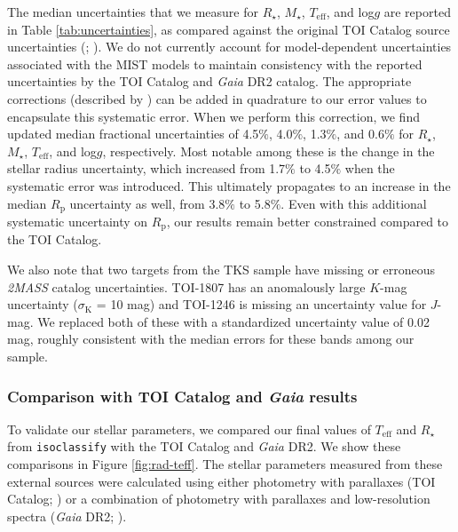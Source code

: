 \documentclass[twocolumn]{aastex63}
\begin{document}
The median uncertainties that we measure for $R_{\star}$, $M_{\star}$, $T_\textrm{eff}$, and log$g$ are reported in Table \ref{tab:uncertainties}, as compared against the original TOI Catalog source uncertainties (\citealt{Guerrero21}; \citealt{toi}). We do not currently account for model-dependent uncertainties associated with the MIST models to maintain consistency with the reported uncertainties by the TOI Catalog and \textit{Gaia} DR2 catalog. The appropriate corrections (described by \citealt{Tayar20}) can be added in quadrature to our error values to encapsulate this systematic error. When we perform this correction, we find updated median fractional uncertainties of 4.5$\%$, 4.0$\%$, 1.3$\%$, and 0.6$\%$ for $R_{\star}$, $M_{\star}$, $T_\textrm{eff}$, and log$g$, respectively. Most notable among these is the change in the stellar radius uncertainty, which increased from 1.7$\%$ to 4.5$\%$ when the systematic error was introduced. This ultimately propagates to an increase in the median $R_\textrm{p}$ uncertainty as well, from 3.8$\%$ to 5.8$\%$. Even with this additional systematic uncertainty on $R_\textrm{p}$, our results remain better constrained compared to the TOI Catalog.

We also note that two targets from the TKS sample have missing or erroneous \textit{2MASS} catalog uncertainties. TOI-1807 has an anomalously large $K$-mag uncertainty ($\sigma_\textrm{K}$ = 10 mag) and TOI-1246 is missing an uncertainty value for $J$-mag. We replaced both of these with a standardized uncertainty value of 0.02 mag, roughly consistent with the median errors for these bands among our sample.

\subsubsection{Comparison with TOI Catalog and \textit{Gaia} results}
\label{sec:comparison}

To validate our stellar parameters, we compared our final values of $T_\textrm{eff}$ and $R_{\star}$ from \texttt{isoclassify} with the TOI Catalog and \textit{Gaia} DR2. We show these comparisons in Figure \ref{fig:rad-teff}. The stellar parameters measured from these external sources were calculated using either photometry with parallaxes (TOI Catalog; \citealt{Stassun18}) or a combination of photometry with parallaxes and low-resolution spectra (\textit{Gaia} DR2; \citealt{BailerJones13}). 
\end{document}
